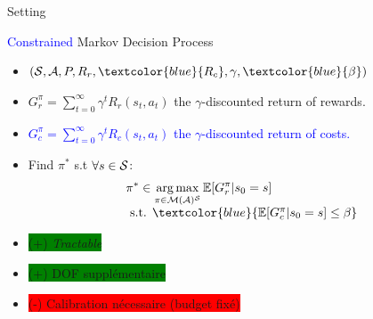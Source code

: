 \documentclass[french,handout]{beamer}
\begin{document}
    \begin{frame}{Setting}

        \begin{block}{\textcolor{blue}{Constrained} Markov Decision Process}
            \begin{itemize}
                \item $(\cS, \cA, P, R_r,\textcolor{blue}{R_c}, \gamma,\textcolor{blue}{\beta})$
                \item $G_r^\pi = \sum_{t=0}^\infty \gamma^t R_r(s_t, a_t)$ the $\gamma$-discounted return of rewards.
                \item \textcolor{blue}{ $G_c^\pi = \sum_{t=0}^\infty \gamma^t R_c(s_t, a_t)$ the $\gamma$-discounted return of costs.}
                \item Find $\pi^*$ s.t $\forall s\in\mathcal{S}$:
                \begin{equation}
                    \label{eq:cmdp}
                    \begin{array}{lcr}
                        \displaystyle \pi^* \in \argmax_{\pi\in\cM(\cA)^\cS} \expectedvalue[G_r^\pi | s_0=s] \\
                        \text{ s.t. }  \textcolor{blue}{\expectedvalue[G_c^\pi | s_0=s] \leq \beta}
                    \end{array}
                \end{equation}
            \end{itemize}
        \end{block}

        \begin{block}{}
            \begin{itemize}
                \item \colorbox{green}{(+) \textit{Tractable}}
                \item \colorbox{green}{(+) DOF supplémentaire}%
                \item \colorbox{red}{(-) Calibration nécessaire (budget fixé)}


            \end{itemize}
        \end{block}

    \end{frame}
\end{document}
